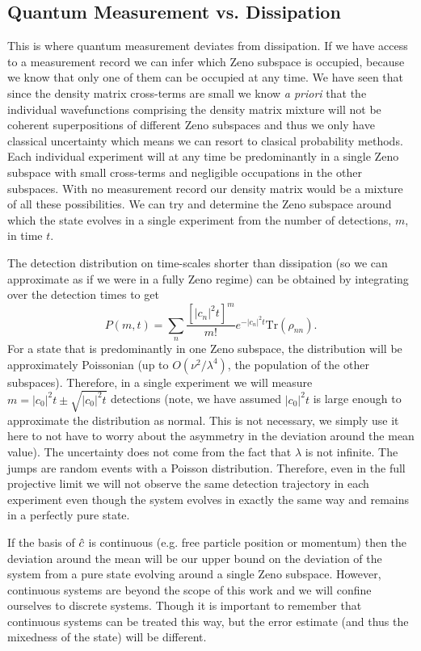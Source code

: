 \subsection{Quantum Measurement vs. Dissipation}

This is where quantum measurement deviates from dissipation. If we
have access to a measurement record we can infer which Zeno subspace
is occupied, because we know that only one of them can be occupied at
any time. We have seen that since the density matrix cross-terms are
small we know \emph{a priori} that the individual wavefunctions
comprising the density matrix mixture will not be coherent
superpositions of different Zeno subspaces and thus we only have
classical uncertainty which means we can resort to clasical
probability methods. Each individual experiment will at any time be
predominantly in a single Zeno subspace with small cross-terms and
negligible occupations in the other subspaces. With no measurement
record our density matrix would be a mixture of all these
possibilities. We can try and determine the Zeno subspace around which
the state evolves in a single experiment from the number of
detections, $m$, in time $t$.

The detection distribution on time-scales shorter than dissipation (so
we can approximate as if we were in a fully Zeno regime) can be
obtained by integrating over the detection times \cite{mekhov2009pra}
to get
\begin{equation}
  P(m,t) = \sum_n \frac{[|c_n|^2 t]^m} {m!} e^{-|c_n|^2 t} \mathrm{Tr} (\rho_{nn}).
\end{equation}
For a state that is predominantly in one Zeno subspace, the
distribution will be approximately Poissonian (up to
$O(\nu^2 / \lambda^4)$, the population of the other
subspaces). Therefore, in a single experiment we will measure
$m = |c_0|^2t \pm \sqrt{|c_0|^2t}$ detections (note, we have assumed
$|c_0|^2 t$ is large enough to approximate the distribution as
normal. This is not necessary, we simply use it here to not have to
worry about the asymmetry in the deviation around the mean value). The
uncertainty does not come from the fact that $\lambda$ is not
infinite. The jumps are random events with a Poisson
distribution. Therefore, even in the full projective limit we will not
observe the same detection trajectory in each experiment even though
the system evolves in exactly the same way and remains in a perfectly
pure state.

If the basis of $\hat{c}$ is continuous (e.g. free particle position or
momentum) then the deviation around the mean will be our upper bound
on the deviation of the system from a pure state evolving around a
single Zeno subspace. However, continuous systems are beyond the scope
of this work and we will confine ourselves to discrete systems. Though
it is important to remember that continuous systems can be treated
this way, but the error estimate (and thus the mixedness of the state)
will be different.

